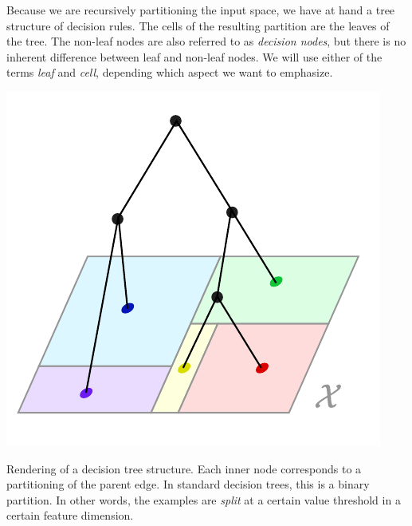 \documentclass[../main.tex]{subfiles}
\begin{document}
Because we are recursively partitioning the input space, we have at hand a tree structure of decision rules. The cells of the resulting partition are the leaves of the tree. The non-leaf nodes are also referred to as \textit{decision nodes}, but there is no inherent difference between leaf and non-leaf nodes. We will use either of the terms \textit{leaf} and \textit{cell}, depending which aspect we want to emphasize.



\begin{marginfigure}
    \label{fig:decision-tree-partition}
    \includegraphics[width=\textwidth]{figma-illustrations/decision-tree}
    \caption{
        Rendering of a decision tree structure. Each inner node corresponds to a partitioning of the parent edge. In standard decision trees, this is a binary partition. In other words, the examples are \textit{split} at a certain value threshold in a certain feature dimension.    }
\end{marginfigure}
\end{document}
